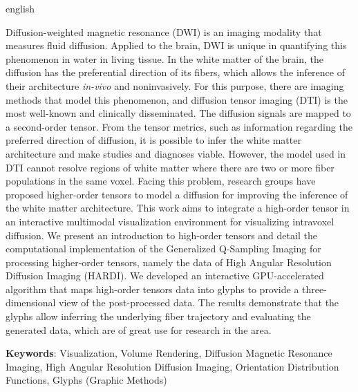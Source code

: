 \documentclass[
    12pt,                %
    oneside,            %
    a4paper,            %
    english,            %
    french,                %
    spanish,            %
    brazil                %
    ]{abntex2}
\begin{document}
\pagebreak
%
\begin{resumo}[Abstract]
 \begin{otherlanguage*}{english}

Diffusion-weighted magnetic resonance (DWI) is an imaging modality that measures fluid diffusion. Applied to the brain, DWI is unique in quantifying this phenomenon in water in living tissue. In the white matter of the brain, the diffusion has the preferential direction of its fibers, which allows the inference of their architecture \textit{in-vivo} and noninvasively. For this purpose, there are imaging methods that model this phenomenon, and diffusion tensor imaging (DTI) is the most well-known and clinically disseminated. The diffusion signals are mapped to a second-order tensor. From the tensor metrics, such as information regarding the preferred direction of diffusion, it is possible to infer the white matter architecture and make studies and diagnoses viable. However, the model used in DTI cannot resolve regions of white matter where there are two or more fiber populations in the same voxel. Facing this problem, research groups have proposed higher-order tensors to model a diffusion for improving the inference of the white matter architecture. This work aims to integrate a high-order tensor in an interactive multimodal visualization environment for visualizing intravoxel diffusion. We present an introduction to high-order tensors and detail the computational implementation of the Generalized Q-Sampling Imaging for processing higher-order tensors, namely the data of High Angular Resolution Diffusion Imaging (HARDI). We developed an interactive GPU-accelerated algorithm that maps high-order tensors data into glyphs to provide a three-dimensional view of the post-processed data. The results demonstrate that the glyphs allow inferring the underlying fiber trajectory and evaluating the generated data, which are of great use for research in the area.


\vspace{\onelineskip}
\noindent\textbf{Keywords}: Visualization, Volume Rendering, Diffusion Magnetic Resonance Imaging, High Angular Resolution Diffusion Imaging, Orientation Distribution Functions, Glyphs (Graphic Methods)
 \end{otherlanguage*}
\end{resumo}
\end{document}

